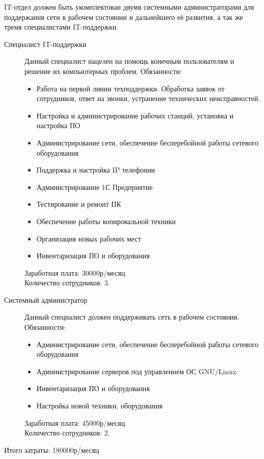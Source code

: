 IT-отдел должен быть укомплектован двумя системными администраторами для поддержания сети в рабочем состоянии и дальнейшего её развития, а так же тремя специалистами IT-поддержки.

\begin{description}
\item[Специалист IT-поддержки] Данный специалист нацелен на помощь конечным пользователям и решение их компьютерных проблем.
  Обязанности:
  \begin{itemize}
  \item Работа на первой линии техподдержки. Обработка заявок от сотрудников, ответ на звонки, устранение технических неисправностей. 
  \item Настройка и администрирование рабочих станций, установка и настройка ПО
  \item Администрирование сети, обеспечение бесперебойной работы сетевого оборудования
  \item Поддержка и настройка IP телефонии
  \item Администрирование 1С Предприятие
  \item Тестирование и ремонт ПК
  \item Обеспечение работы копировальной техники
  \item Организация новых рабочих мест
  \item Инвентаризация ПО и оборудования
  \end{itemize}

  Заработная плата: 30000р/месяц\\
  Количество сотрудников: 3.
\item[Системный администратор] Данный специалист должен поддерживать сеть в рабочем состоянии. 
  Обязанности:
  \begin{itemize}

  \item Администрирование сети, обеспечение бесперебойной работы сетевого оборудования
  \item Администрирование серверов под управлением ОС GNU/Linux
  \item Инвентаризация ПО и оборудования
  \item Настройка новой техники, оборудования
  \end{itemize}
  Заработная плата: 45000р/месяц\\
  Количество сотрудников: 2.
\end{description}

Итого затраты: 180000р/месяц

